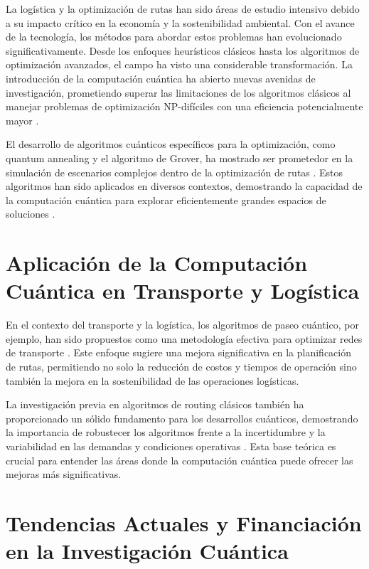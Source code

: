 \documentclass[11pt,a4paper,spanish]{book}
\begin{document}
    La logística y la optimización de rutas han sido áreas de estudio intensivo debido a su impacto crítico en la economía y la sostenibilidad ambiental. Con el avance de la tecnología, los métodos para abordar estos problemas han evolucionado significativamente. Desde los enfoques heurísticos clásicos hasta los algoritmos de optimización avanzados, el campo ha visto una considerable transformación. La introducción de la computación cuántica ha abierto nuevas avenidas de investigación, prometiendo superar las limitaciones de los algoritmos clásicos al manejar problemas de optimización NP-difíciles con una eficiencia potencialmente mayor \citep{nielsenChuang}.

    El desarrollo de algoritmos cuánticos específicos para la optimización, como quantum annealing y el algoritmo de Grover, ha mostrado ser prometedor en la simulación de escenarios complejos dentro de la optimización de rutas \citep{farhiQuantum, groverAlgorithm}. Estos algoritmos han sido aplicados en diversos contextos, demostrando la capacidad de la computación cuántica para explorar eficientemente grandes espacios de soluciones \citep{QWalk-Based}.

    \section{Aplicación de la Computación Cuántica en Transporte y Logística}

    En el contexto del transporte y la logística, los algoritmos de paseo cuántico, por ejemplo, han sido propuestos como una metodología efectiva para optimizar redes de transporte \citep{quantumTransportOpt}. Este enfoque sugiere una mejora significativa en la planificación de rutas, permitiendo no solo la reducción de costos y tiempos de operación sino también la mejora en la sostenibilidad de las operaciones logísticas.

    La investigación previa en algoritmos de routing clásicos también ha proporcionado un sólido fundamento para los desarrollos cuánticos, demostrando la importancia de robustecer los algoritmos frente a la incertidumbre y la variabilidad en las demandas y condiciones operativas \citep{transportationScience}. Esta base teórica es crucial para entender las áreas donde la computación cuántica puede ofrecer las mejoras más significativas.

    \section{Tendencias Actuales y Financiación en la Investigación Cuántica}
\end{document}
